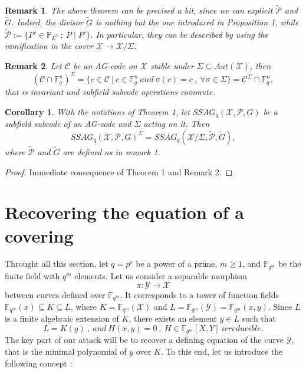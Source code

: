 \documentclass[10pt]{article}
\newtheorem{coro1}{Corollary}[]
\newtheorem{rq1}{Remark}[]
\newcommand{\s}{\vspace{0.3cm}}
\newcommand{\fqm}{\mathbb{F}_{q^m}}
\newcommand{\fq}{\mathbb{F}_q}
\newcommand{\su}{\subseteq}
\newcommand{\X}{\mathcal{X}}
\newcommand{\Y}{\mathcal{Y}}
\newcommand{\PR}{\mathcal{P}}
\begin{document}
\s


\begin{rq1} \rm
The above theorem can be precised a bit, since we can explicit $\tilde{\PR}$ and $\tilde{G}$. Indeed, the divisor $\tilde{G}$ is nothing but the one introduced in Proposition 1, while $\tilde{\PR} := \{P' \in \mathbb{P}_{L^{\sigma}} \ ; \ P \mid P'\}$. In particular, they can be described by using the ramification in the cover $\X \rightarrow \X/\Sigma$.
\end{rq1}

\s

\begin{rq1} \rm
Let $\mathcal{C}$ be an AG-code on $\X$ stable under $\Sigma \su Aut(\X)$, then
\[(\mathcal{C}\cap \fq^n)^{\Sigma} = \{c \in \mathcal{C} \ | \ c \in \fq^n \ and \ \sigma(c)=c \ , \ \forall \sigma \in \Sigma\} = \mathcal{C}^{\Sigma} \cap \fq^n,\]
that is invariant and subfield subcode operations commute.
\end{rq1}

\s

\begin{coro1}
With the notations of Theorem 1, let $SSAG_q(\X,\PR,G)$ be a subfield subcode of an AG-code and $\Sigma$ acting on it. Then 
\[SSAG_q(\X,\PR,G)^{\Sigma} = SSAG_q(\X/\Sigma,\tilde{\PR},\tilde{G}),\]
where $\tilde{\PR}$ and $\tilde{G}$ are defined as in remark 1.
\end{coro1}

\s

\begin{proof}
Immediate consequence of Theorem 1 and Remark 2.
\end{proof}

\s

\section{Recovering the equation of a covering}


\s

Throught all this section, let $q=p^s$ be a power of a prime, $m \geq 1$, and $\fqm$ be the finite field with $q^m$ elements. Let us consider a separable morphism 
\[\pi : \Y \rightarrow \X\]
between curves defined over $\fqm$. It corresponds to a tower of function fields $\fqm(x) \su K \su L$, where $K=\fqm(\X)$ and $L=\fqm(\Y)=\fqm(x,y)$. Since $L$ is a finite  algebraic extension of $K$, there exists an element $y \in L$ such that 
\[L = K(y) \ , \ and \ H(x,y)=0 \ , \ H \in \fqm[X,Y] \ irreducible.\]
The key part of our attack will be to recover a defining equation of the curve $\Y$, that is the minimal polynomial of $y$ over $K$. To this end, let us introduce the following concept :
\end{document}
